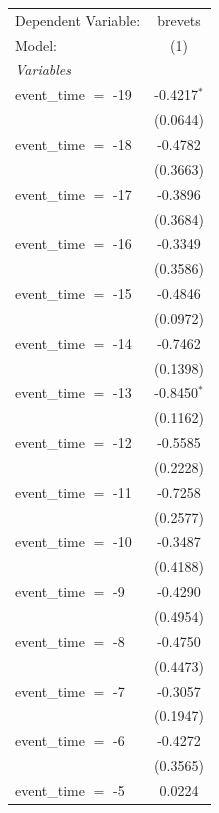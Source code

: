 \begingroup
\centering
\begin{tabular}{lc}
   \tabularnewline \midrule \midrule
   Dependent Variable:  & brevets\\  
   Model:               & (1)\\  
   \midrule
   \emph{Variables}\\
   event\_time $=$ -19  & -0.4217$^{*}$\\   
                        & (0.0644)\\   
   event\_time $=$ -18  & -0.4782\\   
                        & (0.3663)\\   
   event\_time $=$ -17  & -0.3896\\   
                        & (0.3684)\\   
   event\_time $=$ -16  & -0.3349\\   
                        & (0.3586)\\   
   event\_time $=$ -15  & -0.4846\\   
                        & (0.0972)\\   
   event\_time $=$ -14  & -0.7462\\   
                        & (0.1398)\\   
   event\_time $=$ -13  & -0.8450$^{*}$\\   
                        & (0.1162)\\   
   event\_time $=$ -12  & -0.5585\\   
                        & (0.2228)\\   
   event\_time $=$ -11  & -0.7258\\   
                        & (0.2577)\\   
   event\_time $=$ -10  & -0.3487\\   
                        & (0.4188)\\   
   event\_time $=$ -9   & -0.4290\\   
                        & (0.4954)\\   
   event\_time $=$ -8   & -0.4750\\   
                        & (0.4473)\\   
   event\_time $=$ -7   & -0.3057\\   
                        & (0.1947)\\   
   event\_time $=$ -6   & -0.4272\\   
                        & (0.3565)\\   
   event\_time $=$ -5   & 0.0224\\   

\end{tabular}
